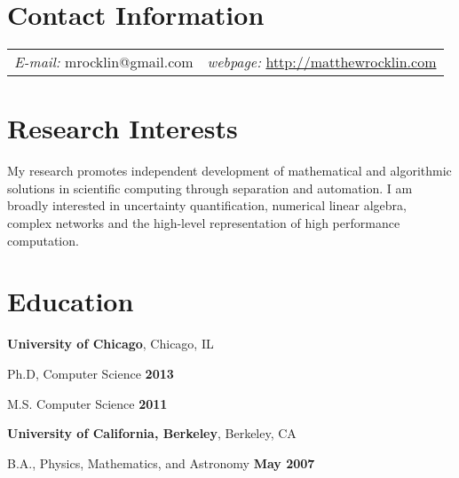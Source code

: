 \documentclass[margin,line]{res}
\newenvironment{list1}{
  \begin{list}{\ding{113}}{%
      \setlength{\itemsep}{0in}
      \setlength{\parsep}{0in} \setlength{\parskip}{0in}
      \setlength{\topsep}{0in} \setlength{\partopsep}{0in} 
      \setlength{\leftmargin}{0.17in}}}{\end{list}}
\begin{document}
\newcommand{\link}[1]{\texttt{#1}}


\begin{resume}
\section{\sc Contact Information}
\vspace{.05in}
\begin{tabular}{@{}p{2in}p{4in}}
{\it E-mail:}  mrocklin@gmail.com   & {\it webpage:} \href{http://matthewrocklin.com}{http://matthewrocklin.com} \\
\end{tabular}


\section{\sc Research Interests}

My research promotes independent development of mathematical and algorithmic solutions in scientific computing through separation and automation. I am broadly interested in uncertainty quantification, numerical linear algebra, complex networks and the high-level representation of high performance computation. 

\section{\sc Education}
{\bf University of Chicago}, Chicago, IL\\
\vspace*{-.1in}
\begin{list1}
\item[] Ph.D, Computer Science \hfill {\bf 2013}
\item[] M.S. Computer Science \hfill {\bf 2011}
\end{list1}

{\bf University of California, Berkeley}, Berkeley, CA\\
\vspace*{-.1in}
\begin{list1}
\item[] B.A., Physics, Mathematics, and Astronomy \hfill {\bf May 2007}
\end{list1}


\end{resume}
\end{document}

